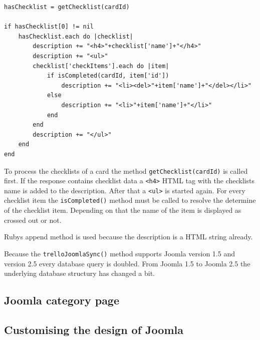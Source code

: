 \begin{lstlisting}[aboveskip=1\baselineskip, caption=Processing the checklists of a card., label=listing032]
hasChecklist = getChecklist(cardId) 

if hasChecklist[0] != nil
	hasChecklist.each do |checklist| 			
		description += "<h4>"+checklist['name']+"</h4>"
		description += "<ul>"
		checklist['checkItems'].each do |item|	
			if isCompleted(cardId, item['id'])
				description += "<li><del>"+item['name']+"</del></li>"
			else
				description += "<li>"+item['name']+"</li>"
			end
		end
		description += "</ul>"
	end	
end
\end{lstlisting}

To process the checklists of a card the method \lstinline{getChecklist(cardId)} is called first. If the response contains checklist data a \lstinline{<h4>} HTML tag with the checklists name is added to the description. After that a \lstinline{<ul>} is started again. For every checklist item the \lstinline{isCompleted()} method must be called to resolve the determine of the checklist item. Depending on that the name of the item is displayed as crossed out or not.

Rubys append method is used because the description is a HTML string already.

Because the \lstinline{trelloJoomlaSync()} method supports Joomla version 1.5 and version 2.5 every database query is doubled. From Joomla 1.5 to Joomla 2.5 the underlying database structury has changed a bit. 








\subsection{Joomla category page}

\subsection{Customising the design of Joomla}


